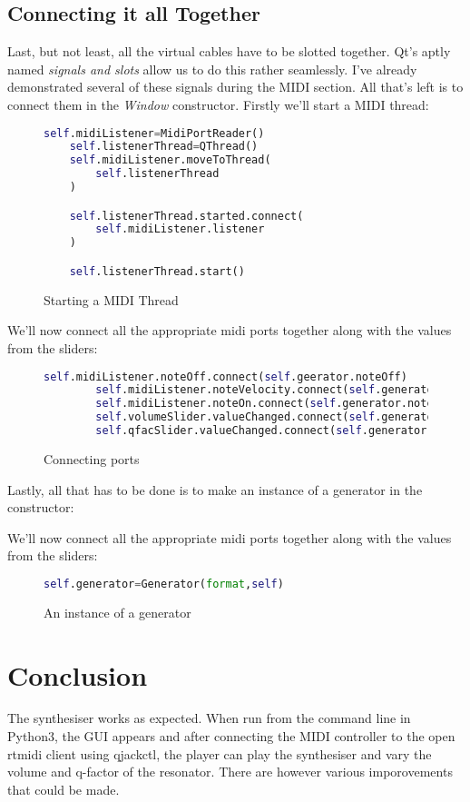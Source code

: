 \documentclass{article}
\begin{document}
\pagebreak
\subsection{Connecting it all Together}
Last, but not least, all the virtual cables have to be slotted together. Qt's aptly named \textit{signals and slots} allow us to do this rather seamlessly. I've already demonstrated several of these signals during the MIDI section. All that's left is to connect them in 
the \textit{Window} constructor. Firstly we'll start a MIDI thread:

 \begin{figure}[H]
	\begin{lstlisting}[language=python]
	self.midiListener=MidiPortReader()
	self.listenerThread=QThread()
	self.midiListener.moveToThread(
		self.listenerThread
	)

	self.listenerThread.started.connect(
		self.midiListener.listener
	)

	self.listenerThread.start()
	\end{lstlisting}
	\caption{Starting a MIDI Thread}

\end{figure}
We'll now connect all the appropriate midi ports together along with the values from the sliders:
 \begin{figure}[H]
	\begin{lstlisting}[language=python]
        self.midiListener.noteOff.connect(self.geerator.noteOff)
        self.midiListener.noteVelocity.connect(self.generator.noteVelocity)
        self.midiListener.noteOn.connect(self.generator.noteOn)
        self.volumeSlider.valueChanged.connect(self.generator.volSlide)
        self.qfacSlider.valueChanged.connect(self.generator.qFactor)
	\end{lstlisting}
	\caption{Connecting ports}
\end{figure}
Lastly, all that has to be done is to make an instance of a generator in the constructor:

We'll now connect all the appropriate midi ports together along with the values from the sliders:
\begin{figure}[H]
\begin{lstlisting}[language=python]
	self.generator=Generator(format,self)
\end{lstlisting}
\caption{An instance of a generator}
\end{figure}

\pagebreak
\section{Conclusion}
The synthesiser works as expected. When run from the command line in Python3, the GUI appears and after connecting the MIDI controller to the open rtmidi client using qjackctl, the player can play the synthesiser and vary the volume and q-factor of the resonator. There are however various imporovements that could be made.
\end{document}
